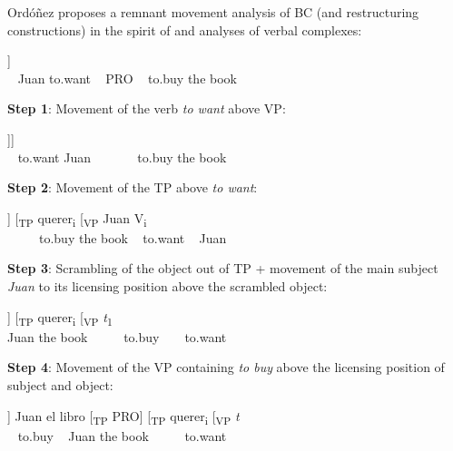 \documentclass[output=paper]{langsci/langscibook}
\begin{document}
Ordóñez proposes a remnant movement analysis of BC (and restructuring constructions) in the spirit of  and  analyses of verbal complexes:

\ea%
    \label{ex:alexiadou:18}
    \begin{xlista}
    \setcounter{xnumii}{0}
    \ex \gll\relax [\textsubscript{VP} Juan [querer [\textsubscript{CP} PRO [\textsubscript{VP} comprar el libro]]\\
                    ~ Juan to.want ~ PRO ~ to.buy the book\\
    \end{xlista}
    \textsf{\bfseries Step 1}: Movement of the verb \textit{to want} above VP:
    \begin{xlista}
    \setcounter{xnumii}{1}
    \ex \gll\relax [\textsubscript{TP} querer\textsubscript{} Juan V\textsubscript{i} [\textsubscript{TP} PRO [\textsubscript{VP} comprar el libro]]]\\
      ~ to.want Juan ~ ~ ~ ~ to.buy the book\\
    \end{xlista}
    \textsf{\bfseries Step 2}: Movement of the TP above \textit{to want}:
    \begin{xlista}
    \setcounter{xnumii}{2}
    \ex \gll\relax [\textsubscript{TP} PRO [\textsubscript{VP} comprar el libro]] [\textsubscript{TP} querer\textsubscript{i} [\textsubscript{VP} Juan V\textsubscript{i}\\
       ~ ~ ~ to.buy the book ~ to.want ~ Juan\\
    \end{xlista}
    \textsf{\bfseries Step 3}: Scrambling of the object out of TP + movement of the main subject \textit{Juan} to its licensing position above the scrambled object:
    \begin{xlista}
    \setcounter{xnumii}{3}
    \ex \gll\relax  [Juan\textsubscript{1} el libro\textsubscript{2} [\textsubscript{TP} PRO [\textsubscript{VP} comprar \textit{t}\textsubscript{2}]] [\textsubscript{TP} querer\textsubscript{i} [\textsubscript{VP} \textit{t}\textsubscript{1}\\
                    Juan the book ~ ~ ~ to.buy ~ ~ to.want\\
    \end{xlista}
    \textsf{\bfseries Step 4}: Movement of the VP containing \textit{to buy} above the licensing position of subject and object:
    \begin{xlista}
    \setcounter{xnumii}{4}
    \ex \gll\relax [[\textsubscript{VP} comprar \textit{t}]] Juan el libro [\textsubscript{TP} PRO] [\textsubscript{TP} querer\textsubscript{i} [\textsubscript{VP} \textit{t}\\
                   ~ to.buy ~ Juan the book ~ ~ ~ to.want\\
    \end{xlista}
\end{document}
